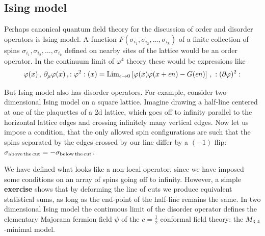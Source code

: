 \documentclass[12pt]{article}
\numberwithin{equation}{section}
\newcommand{\ep}{{\epsilon}}
\newcommand\beq{\begin{equation}}
\newcommand\eeq{\end{equation}}
\theoremstyle{definition}
\begin{document}
\subsection{Ising model}
Perhaps canonical quantum field theory for the discussion of order and disorder operators is Ising model. A function $F({\sigma}_{i_{1}}, {\sigma}_{i_{2}}, \ldots, {\sigma}_{i_{k}})$ of a finite collection 
of spins ${\sigma}_{i_{1}}, {\sigma}_{i_{2}}, \ldots, {\sigma}_{i_{k}}$ defined on nearby sites of the lattice would be an order operator. In the continuum limit of ${\varphi}^{4}$ theory these would be expressions like
\beq
{\varphi}(x)\, , \, {\partial}_{\mu}{\varphi}(x)\, , : {\varphi}^{2} : (x) = {\rm Lim}_{{\ep}\to 0} \left[ {\varphi}(x) {\varphi}(x+{\ep} n) - G({\ep}n) \right] \, , \ : ({\partial}{\varphi})^2 :
\eeq

But Ising model also has  disorder operators. For example, consider two dimensional Ising model on a square lattice. Imagine drawing a half-line
centered at one of the plaquettes of a 2d lattice, which goes off to infinity parallel to the horizontal  lattice edges and crossing infinitely many vertical edges. Now let us impose a condition, that
the only allowed spin configurations are such that the spins separated by the edges crossed by our line differ by a $(-1)$ flip: ${\sigma}_{\rm above\, the\, cut} = - {\sigma}_{\rm below\, the\, cut}$. 

We have defined what looks like a non-local operator, since we have imposed some conditions on an array of spins going off to infinity. However, a simple {\bf\color{red} exercise} shows that by deforming the line of cuts we produce equivalent statistical sums, as long as the end-point of the half-line remains the same. In two dimensional Ising model the continuous limit of the disorder operator defines the elementary Majorana fermion field ${\psi}$ of the $c=\frac{1}{2}$ conformal field theory: the $M_{3,4}$-minimal model. 
\fi
\end{document}
